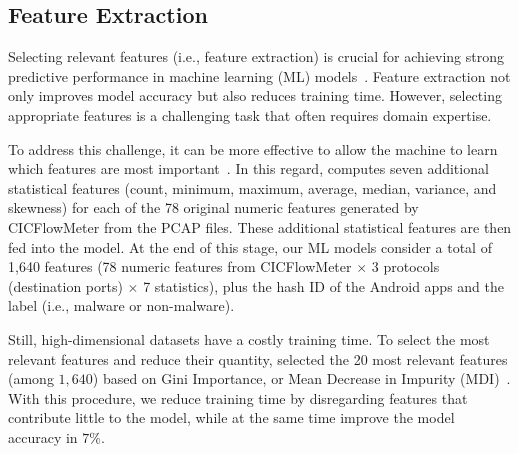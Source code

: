 \subsection{Feature Extraction}\label{sec:extraction}


Selecting relevant features (i.e., feature extraction) is crucial for achieving strong predictive performance in
machine learning (ML) models~\cite{DBLP:conf/ichmi/Xie22,DBLP:journals/mta/AmiriebrahimabadiM24}. Feature extraction not only
improves model accuracy but also reduces training time. However, selecting appropriate features is a challenging task that often requires domain expertise. 

To address this challenge, it can be more effective to allow the machine to learn which features are most important~\cite{DBLP:journals/spe/FallahB22}.
In this regard, \droidxpflow computes seven additional statistical features (count, minimum, maximum, average, median, variance, and skewness)
for each of the 78 original numeric features generated by CICFlowMeter from the PCAP files. These additional statistical features are then fed into the model. 
At the end of this stage, our ML models consider a total of 1,640 features (78 numeric features from CICFlowMeter $\times$ 3 protocols (destination ports) $\times$ 7 statistics),  
plus the hash ID of the Android apps and the label (i.e., malware or non-malware).


Still, high-dimensional datasets have a costly training time. To select the most relevant features and reduce their quantity, \droidxpflow selected the 20 most relevant features (among $1,640$) based on Gini Importance, or Mean Decrease in Impurity (MDI)~\cite{james2023introduction}. With this procedure, we reduce training time by disregarding features that contribute little to the model, while at the same time improve the model accuracy in $7\%$.
